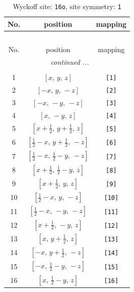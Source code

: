 \documentclass[fleqn,8pt]{jsarticle}
\begin{document}
\begin{longtable}{ccc}
\caption{Wyckoff site: {\tt 16o}, site symmetry: {\tt 1}}
 \\
 \hline \hline
No. & position & mapping \\ \hline \endfirsthead

\multicolumn{2}{l}{\tablename\ \thetable{}} \\
 \hline \hline
No. & position & mapping \\ \hline \endhead

 \hline \hline
\multicolumn{2}{r}{\footnotesize\it continued ...} \\ \endfoot

 \hline \hline
\multicolumn{2}{r}{} \\ \endlastfoot

1 & $\left[ x,\, y,\, z \right]$ & {\tt [1]} \\ \hline
2 & $\left[ - x,\, y,\, - z \right]$ & {\tt [2]} \\ \hline
3 & $\left[ - x,\, - y,\, - z \right]$ & {\tt [3]} \\ \hline
4 & $\left[ x,\, - y,\, z \right]$ & {\tt [4]} \\ \hline
5 & $\left[ x + \frac{1}{2},\, y + \frac{1}{2},\, z \right]$ & {\tt [5]} \\ \hline
6 & $\left[ \frac{1}{2} - x,\, y + \frac{1}{2},\, - z \right]$ & {\tt [6]} \\ \hline
7 & $\left[ \frac{1}{2} - x,\, \frac{1}{2} - y,\, - z \right]$ & {\tt [7]} \\ \hline
8 & $\left[ x + \frac{1}{2},\, \frac{1}{2} - y,\, z \right]$ & {\tt [8]} \\ \hline
9 & $\left[ x + \frac{1}{2},\, y,\, z \right]$ & {\tt [9]} \\ \hline
10 & $\left[ \frac{1}{2} - x,\, y,\, - z \right]$ & {\tt [10]} \\ \hline
11 & $\left[ \frac{1}{2} - x,\, - y,\, - z \right]$ & {\tt [11]} \\ \hline
12 & $\left[ x + \frac{1}{2},\, - y,\, z \right]$ & {\tt [12]} \\ \hline
13 & $\left[ x,\, y + \frac{1}{2},\, z \right]$ & {\tt [13]} \\ \hline
14 & $\left[ - x,\, y + \frac{1}{2},\, - z \right]$ & {\tt [14]} \\ \hline
15 & $\left[ - x,\, \frac{1}{2} - y,\, - z \right]$ & {\tt [15]} \\ \hline
16 & $\left[ x,\, \frac{1}{2} - y,\, z \right]$ & {\tt [16]} \\
\end{longtable}
\end{document}
